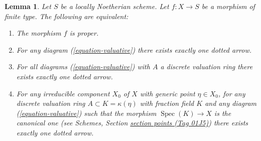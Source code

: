 \documentclass{amsart}
\theoremstyle{plain}
\newtheorem{lemma}[subsection]{Lemma}
\theoremstyle{definition}
\theoremstyle{remark}
\numberwithin{equation}{subsection}
\def\Spec{\mathop{\mathrm{Spec}}}
\begin{document}
\begin{lemma}
\label{lemma-Noetherian-dvr-valuative-proper}
Let $S$ be a locally Noetherian scheme.
Let $f : X \to S$ be a morphism of finite type.
The following are equivalent:
\begin{enumerate}
\item The morphism $f$ is proper.
\item For any diagram (\ref{equation-valuative}) there exists exactly
one dotted arrow.
\item For all diagrams (\ref{equation-valuative}) with $A$ a discrete
valuation ring there exists exactly one dotted arrow.
\item For any irreducible component $X_0$ of $X$ with
generic point $\eta \in X_0$, for any discrete valuation ring
$A \subset K = \kappa(\eta)$ with fraction field $K$ and any
diagram (\ref{equation-valuative}) such that
the morphism $\Spec(K) \to X$ is the canonical one
(see
Schemes, Section \href{https://stacks.math.columbia.edu/tag/01J5}{section points (Tag 01J5)})
there exists exactly one dotted arrow.
\end{enumerate}
\end{lemma}
\end{document}
